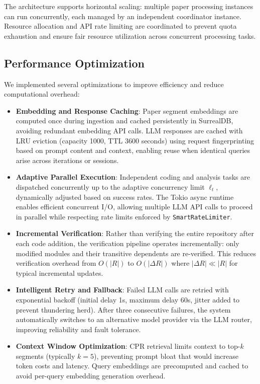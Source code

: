 \documentclass{ieeeaccess}
\begin{document}
The architecture supports horizontal scaling: multiple paper processing instances can run concurrently, each managed by an independent coordinator instance. Resource allocation and API rate limiting are coordinated to prevent quota exhaustion and ensure fair resource utilization across concurrent processing tasks.

\subsection{Performance Optimization}
We implemented several optimizations to improve efficiency and reduce computational overhead:

\begin{itemize}
    \item \textbf{Embedding and Response Caching}: Paper segment embeddings are computed once during ingestion and cached persistently in SurrealDB, avoiding redundant embedding API calls. LLM responses are cached with LRU eviction (capacity 1000, TTL 3600 seconds) using request fingerprinting based on prompt content and context, enabling reuse when identical queries arise across iterations or sessions.
    
    \item \textbf{Adaptive Parallel Execution}: Independent coding and analysis tasks are dispatched concurrently up to the adaptive concurrency limit \(\ell_t\), dynamically adjusted based on success rates. The Tokio async runtime enables efficient concurrent I/O, allowing multiple LLM API calls to proceed in parallel while respecting rate limits enforced by \texttt{SmartRateLimiter}.
    
    \item \textbf{Incremental Verification}: Rather than verifying the entire repository after each code addition, the verification pipeline operates incrementally: only modified modules and their transitive dependents are re-verified. This reduces verification overhead from \(O(|R|)\) to \(O(|\Delta R|)\) where \(|\Delta R| \ll |R|\) for typical incremental updates.
    
    \item \textbf{Intelligent Retry and Fallback}: Failed LLM calls are retried with exponential backoff (initial delay 1s, maximum delay 60s, jitter added to prevent thundering herd). After three consecutive failures, the system automatically switches to an alternative model provider via the LLM router, improving reliability and fault tolerance.
    
    \item \textbf{Context Window Optimization}: CPR retrieval limits context to top-\(k\) segments (typically \(k=5\)), preventing prompt bloat that would increase token costs and latency. Query embeddings are precomputed and cached to avoid per-query embedding generation overhead.
\end{itemize}
\end{document}
